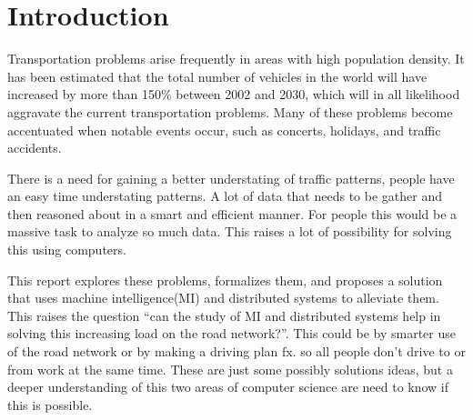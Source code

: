 \chapter{Introduction}\label{chap:introduction}

Transportation problems arise frequently in areas with high population density. It has been estimated that the total number of vehicles in the world will have increased by more than 150\% between 2002 and 2030\cite{dargay2007vehicle}, which will in all likelihood aggravate the current transportation problems. Many of these problems become accentuated when notable events occur, such as concerts, holidays, and traffic accidents.

There is a need for gaining a better understating of traffic patterns, people have an easy time understating patterns. A lot of data that needs to be gather and then reasoned about in a smart and efficient manner. For people this would be a massive task to analyze so much data. This raises a lot of possibility for solving this using computers.

This report explores these problems, formalizes them, and proposes a solution that uses machine intelligence(MI) and distributed systems to alleviate them. This raises the question ``can the study of MI and distributed systems help in solving this increasing load on the road network?''. This could be by smarter use of the road network or by making a driving plan fx. so all people don't drive to or from work at the same time. These are just some possibly solutions ideas, but a deeper understanding of this two areas of computer science are need to know if this is possible.

